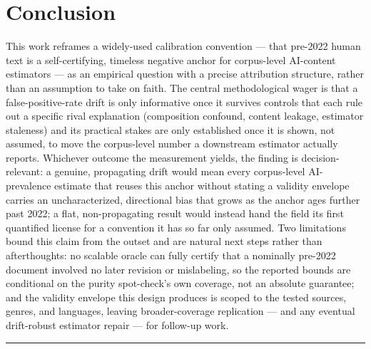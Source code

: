 \documentclass[11pt]{article}
\begin{document}
\section{Conclusion}

This work reframes a widely-used calibration convention --- that pre-2022 human text is a self-certifying, timeless negative anchor for corpus-level AI-content estimators --- as an empirical question with a precise attribution structure, rather than an assumption to take on faith. The central methodological wager is that a false-positive-rate drift is only informative once it survives controls that each rule out a specific rival explanation (composition confound, content leakage, estimator staleness) and its practical stakes are only established once it is shown, not assumed, to move the corpus-level number a downstream estimator actually reports. Whichever outcome the measurement yields, the finding is decision-relevant: a genuine, propagating drift would mean every corpus-level AI-prevalence estimate that reuses this anchor without stating a validity envelope carries an uncharacterized, directional bias that grows as the anchor ages further past 2022; a flat, non-propagating result would instead hand the field its first quantified license for a convention it has so far only assumed. Two limitations bound this claim from the outset and are natural next steps rather than afterthoughts: no scalable oracle can fully certify that a nominally pre-2022 document involved no later revision or mislabeling, so the reported bounds are conditional on the purity spot-check's own coverage, not an absolute guarantee; and the validity envelope this design produces is scoped to the tested sources, genres, and languages, leaving broader-coverage replication --- and any eventual drift-robust estimator repair --- for follow-up work.




\vspace{1em}
\hrule
\vspace{1em}
\end{document}
